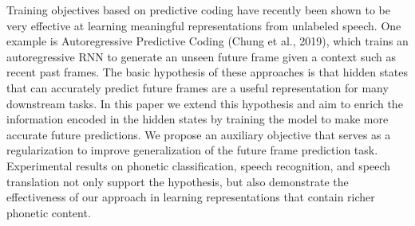 Training objectives based on predictive coding have recently been shown to be very effective at learning meaningful representations from unlabeled speech. One example is Autoregressive Predictive Coding (Chung et al., 2019), which trains an autoregressive RNN to generate an unseen future frame given a context such as recent past frames. The basic hypothesis of these approaches is that hidden states that can accurately predict future frames are a useful representation for many downstream tasks. In this paper we extend this hypothesis and aim to enrich the information encoded in the hidden states by training the model to make more accurate future predictions. We propose an auxiliary objective that serves as a regularization to improve generalization of the future frame prediction task. Experimental results on phonetic classification, speech recognition, and speech translation not only support the hypothesis, but also demonstrate the effectiveness of our approach in learning representations that contain richer phonetic content.
